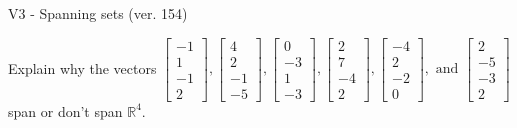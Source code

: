 \begin{exercise}
  \begin{exerciseTitle}V3 - Spanning sets (ver. 154)\end{exerciseTitle}
  \begin{exerciseStatement}
    Explain why the vectors \(\left[\begin{array}{r}
-1 \\
1 \\
-1 \\
2
\end{array}\right] , \left[\begin{array}{r}
4 \\
2 \\
-1 \\
-5
\end{array}\right] , \left[\begin{array}{r}
0 \\
-3 \\
1 \\
-3
\end{array}\right] , \left[\begin{array}{r}
2 \\
7 \\
-4 \\
2
\end{array}\right] , \left[\begin{array}{r}
-4 \\
2 \\
-2 \\
0
\end{array}\right] , \text{ and } \left[\begin{array}{r}
2 \\
-5 \\
-3 \\
2
\end{array}\right]\) span or don't span \(\mathbb{R}^4\). 
	



\end{exerciseStatement}
\end{exercise}
